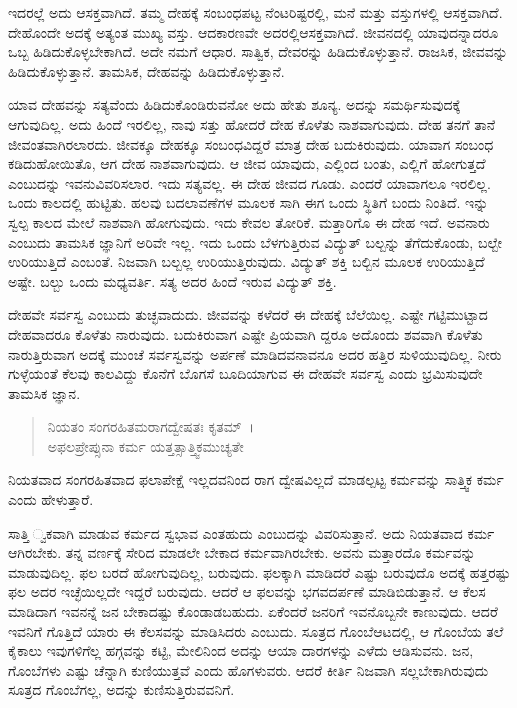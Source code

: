 ಇದರಲ್ಲೆ ಅದು ಆಸಕ್ತವಾಗಿದೆ. ತಮ್ಮ ದೇಹಕ್ಕೆ ಸಂಬಂಧಪಟ್ಟ ನೆಂಟರಿಷ್ಟರಲ್ಲಿ, ಮನೆ ಮತ್ತು ವಸ್ತುಗಳಲ್ಲಿ ಆಸಕ್ತವಾಗಿದೆ. ದೇಹೊಂದೇ ಅದಕ್ಕೆ ಅತ್ಯಂತ ಮುಖ್ಯ ವಸ್ತು. ಆದಕಾರಣವೇ ಅದರಲ್ಲಿಆಸಕ್ತವಾಗಿದೆ. ಜೀವನದಲ್ಲಿ ಯಾವುದನ್ನಾದರೂ ಒಬ್ಬ ಹಿಡಿದುಕೊಳ್ಳಬೇಕಾಗಿದೆ. ಅದೇ ನಮಗೆ ಆಧಾರ. ಸಾತ್ವಿಕ, ದೇವರನ್ನು ಹಿಡಿದುಕೊಳ್ಳುತ್ತಾನೆ. ರಾಜಸಿಕ, ಜೀವವನ್ನು ಹಿಡಿದುಕೊಳ್ಳುತ್ತಾನೆ. ತಾಮಸಿಕ, ದೇಹವನ್ನು ಹಿಡಿದುಕೊಳ್ಳುತ್ತಾನೆ.

ಯಾವ ದೇಹವನ್ನು ಸತ್ಯವೆಂದು ಹಿಡಿದುಕೊಂಡಿರುವನೋ ಅದು ಹೇತು ಶೂನ್ಯ. ಅದನ್ನು ಸಮರ್ಥಿಸುವುದಕ್ಕೆ ಆಗುವುದಿಲ್ಲ. ಅದು ಹಿಂದೆ ಇರಲಿಲ್ಲ, ನಾವು ಸತ್ತು ಹೋದರೆ ದೇಹ ಕೊಳೆತು ನಾಶವಾಗುವುದು. ದೇಹ ತನಗೆ ತಾನೆ ಜೀವಂತವಾಗಿರಲಾರದು. ಜೀವಕ್ಕೂ ದೇಹಕ್ಕೂ ಸಂಬಂಧವಿದ್ದರೆ ಮಾತ್ರ ದೇಹ ಬದುಕಿರುವುದು. ಯಾವಾಗ ಸಂಬಂಧ ಕಡಿದುಹೋಯಿತೊ, ಆಗ ದೇಹ ನಾಶವಾಗುವುದು. ಆ ಜೀವ ಯಾವುದು, ಎಲ್ಲಿಂದ ಬಂತು, ಎಲ್ಲಿಗೆ ಹೋಗುತ್ತದೆ ಎಂಬುದನ್ನು ಇವನುವಿವರಿಸಲಾರ. ಇದು ಸತ್ಯವಲ್ಲ. ಈ ದೇಹ ಜೀವದ ಗೂಡು. ಎಂದರೆ ಯಾವಾಗಲೂ ಇರಲಿಲ್ಲ. ಒಂದು ಕಾಲದಲ್ಲಿ ಹುಟ್ಟಿತು. ಹಲವು ಬದಲಾವಣೆಗಳ ಮೂಲಕ ಸಾಗಿ ಈಗ ಒಂದು ಸ್ಥಿತಿಗೆ ಬಂದು ನಿಂತಿದೆ. ಇನ್ನು ಸ್ವಲ್ಪ ಕಾಲದ ಮೇಲೆ ನಾಶವಾಗಿ ಹೋಗುವುದು. ಇದು ಕೇವಲ ತೋರಿಕೆ. ಮತ್ತಾರಿಗೊ ಈ ದೇಹ ಇದೆ. ಅವನಾರು ಎಂಬುದು ತಾಮಸಿಕ ಜ್ಞಾನಿಗೆ ಅರಿವೇ ಇಲ್ಲ. ಇದು ಒಂದು ಬೆಳಗುತ್ತಿರುವ ವಿದ್ಯುತ್ ಬಲ್ಬನ್ನು ತೆಗೆದುಕೊಂಡು, ಬಲ್ಬೇ ಉರಿಯುತ್ತಿದೆ ಎಂಬಂತೆ. ನಿಜವಾಗಿ ಬಲ್ಬಲ್ಲ ಉರಿಯುತ್ತಿರುವುದು. ವಿದ್ಯುತ್ ಶಕ್ತಿ ಬಲ್ಬಿನ ಮೂಲಕ ಉರಿಯುತ್ತಿದೆ ಅಷ್ಟೇ. ಬಲ್ಬು ಒಂದು ಮಧ್ಯವರ್ತಿ. ಸತ್ಯ ಅದರ ಹಿಂದೆ ಇರುವ ವಿದ್ಯುತ್ ಶಕ್ತಿ.

ದೇಹವೇ ಸರ್ವಸ್ವ ಎಂಬುದು ತುಚ್ಛವಾದುದು. ಜೀವವನ್ನು ಕಳೆದರೆ ಈ ದೇಹಕ್ಕೆ ಬೆಲೆಯಿಲ್ಲ. ಎಷ್ಟೇ ಗಟ್ಟಿಮುಟ್ಟಾದ ದೇಹವಾದರೂ ಕೊಳೆತು ನಾರುವುದು. ಬದುಕಿರುವಾಗ ಎಷ್ಟೇ ಪ್ರಿಯವಾಗಿ ದ್ದರೂ ಅದೊಂದು ಶವವಾಗಿ ಕೊಳೆತು ನಾರುತ್ತಿರುವಾಗ ಅದಕ್ಕೆ ಮುಂಚೆ ಸರ್ವಸ್ವವನ್ನು ಅರ್ಪಣೆ ಮಾಡಿದವನಾವನೂ ಅದರ ಹತ್ತಿರ ಸುಳಿಯುವುದಿಲ್ಲ. ನೀರು ಗುಳ್ಳೆಯಂತೆ ಕೆಲವು ಕಾಲವಿದ್ದು ಕೊನೆಗೆ ಬೊಗಸೆ ಬೂದಿಯಾಗುವ ಈ ದೇಹವೇ ಸರ್ವಸ್ವ ಎಂದು ಭ್ರಮಿಸುವುದೇ ತಾಮಸಿಕ ಜ್ಞಾನ.

\begin{verse}
ನಿಯತಂ ಸಂಗರಹಿತಮರಾಗದ್ವೇಷತಃ ಕೃತಮ್~।\\ಅಫಲಪ್ರೇಪ್ಸುನಾ ಕರ್ಮ ಯತ್ತತ್ಸಾತ್ತ್ವಿಕಮುಚ್ಯತೇ 
\end{verse}

{\small ನಿಯತವಾದ ಸಂಗರಹಿತವಾದ ಫಲಾಪೇಕ್ಷೆ ಇಲ್ಲದವನಿಂದ ರಾಗ ದ್ವೇಷವಿಲ್ಲದೆ ಮಾಡಲ್ಪಟ್ಟ ಕರ್ಮವನ್ನು ಸಾತ್ತ್ವಿಕ ಕರ್ಮ ಎಂದು ಹೇಳುತ್ತಾರೆ.}

ಸಾತ್ತಿ ್ವಕವಾಗಿ ಮಾಡುವ ಕರ್ಮದ ಸ್ವಭಾವ ಎಂತಹುದು ಎಂಬುದನ್ನು ವಿವರಿಸುತ್ತಾನೆ. ಅದು ನಿಯತವಾದ ಕರ್ಮ ಆಗಿರಬೇಕು. ತನ್ನ ವರ್ಣಕ್ಕೆ ಸೇರಿದ ಮಾಡಲೇ ಬೇಕಾದ ಕರ್ಮವಾಗಿರಬೇಕು. ಅವನು ಮತ್ತಾರದೊ ಕರ್ಮವನ್ನು ಮಾಡುವುದಿಲ್ಲ. ಫಲ ಬರದೆ ಹೋಗುವುದಿಲ್ಲ, ಬರುವುದು. ಫಲಕ್ಕಾಗಿ ಮಾಡಿದರೆ ಎಷ್ಟು ಬರುವುದೊ ಅದಕ್ಕೆ ಹತ್ತರಷ್ಟು ಫಲ ಅದರ ಇಚ್ಛೆಯಿಲ್ಲದೇ ಇದ್ದರೆ ಬರುವುದು. ಆದರೆ ಆ ಫಲವನ್ನು ಭಗವದರ್ಪಣೆ ಮಾಡಿಬಿಡುತ್ತಾನೆ. ಆ ಕೆಲಸ ಮಾಡಿದಾಗ ಇವನನ್ನೆ ಜನ ಬೇಕಾದಷ್ಟು ಕೊಂಡಾಡಬಹುದು. ಏಕೆಂದರೆ ಜನರಿಗೆ ಇವನೊಬ್ಬನೇ ಕಾಣುವುದು. ಆದರೆ ಇವನಿಗೆ ಗೊತ್ತಿದೆ ಯಾರು ಈ ಕೆಲಸವನ್ನು ಮಾಡಿಸಿದರು ಎಂಬುದು. ಸೂತ್ರದ ಗೊಂಬೆಆಟದಲ್ಲಿ, ಆ ಗೊಂಬೆಯ ತಲೆ ಕೈಕಾಲು ಇವುಗಳಿಗೆಲ್ಲ ಹಗ್ಗವನ್ನು ಕಟ್ಟಿ, ಮೇಲಿನಿಂದ ಅದನ್ನು ಆಯಾ ದಾರಗಳನ್ನು ಎಳೆದು ಆಡಿಸುವನು. ಜನ, ಗೊಂಬೆಗಳು ಎಷ್ಟು ಚೆನ್ನಾಗಿ ಕುಣಿಯುತ್ತವೆ ಎಂದು ಹೊಗಳುವರು. ಆದರೆ ಕೀರ್ತಿ ನಿಜವಾಗಿ ಸಲ್ಲಬೇಕಾಗಿರುವುದು ಸೂತ್ರದ ಗೊಂಬೆಗಲ್ಲ, ಅದನ್ನು ಕುಣಿಸುತ್ತಿರುವವನಿಗೆ.

